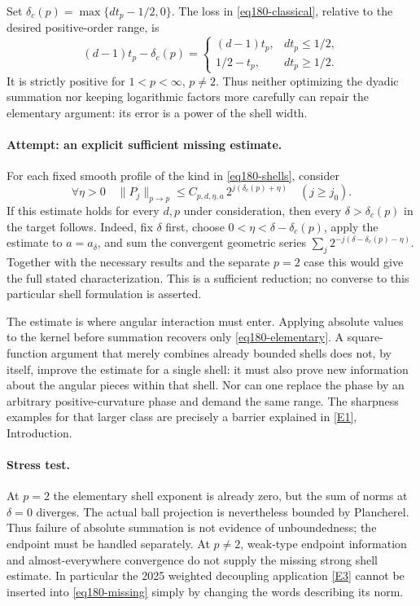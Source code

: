 \documentclass[11pt,a4paper]{article}
\newcommand{\eref}[2]{\hyperlink{extra:#1:#2}{[E#2]}}
\numberwithin{equation}{section}
\begin{document}
Set $\delta_c(p)=\max\{dt_p-1/2,0\}$. The loss in
\eqref{eq180-classical}, relative to the desired positive-order range, is
\begin{equation}\label{eq180-loss}
 (d-1)t_p-\delta_c(p)=
 \begin{cases}(d-1)t_p,&dt_p\le1/2,\\
               1/2-t_p,&dt_p\ge1/2.
 \end{cases}
\end{equation}
It is strictly positive for $1<p<\infty$, $p\ne2$. Thus neither optimizing
the dyadic summation nor keeping logarithmic factors more carefully can
repair the elementary argument: its error is a power of the shell width.

\paragraph{Attempt: an explicit sufficient missing estimate.}
For each fixed smooth profile of the kind in \eqref{eq180-shells}, consider
\begin{equation}\label{eq180-missing}
 \forall\eta>0\quad
 \|P_j\|_{p\to p}\le C_{p,d,\eta,a}\,
                         2^{j(\delta_c(p)+\eta)}
                  \quad(j\ge j_0).
\end{equation}
If this estimate holds for every $d,p$ under consideration, then every
$\delta>\delta_c(p)$ in the target follows. Indeed, fix $\delta$ first,
choose $0<\eta<\delta-\delta_c(p)$, apply the estimate to
$a=a_\delta$, and sum the convergent geometric series
$\sum_j2^{-j(\delta-\delta_c(p)-\eta)}$.
Together with the necessary results and the separate $p=2$ case this
would give the full stated characterization. This is a sufficient
reduction; no converse to this particular shell formulation is asserted.

The estimate is where angular interaction must enter. Applying absolute
values to the kernel before summation recovers only
\eqref{eq180-elementary}. A square-function argument that merely combines
already bounded shells does not, by itself, improve the estimate for a
single shell: it must also prove new information about the angular pieces
within that shell. Nor can one replace the phase by an arbitrary
positive-curvature phase and demand the same range. The sharpness examples
for that larger class are precisely a barrier explained in
\eref{30006774}{1}, Introduction.

\paragraph{Stress test.}
At $p=2$ the elementary shell exponent is already zero, but the sum of
norms at $\delta=0$ diverges. The actual ball projection is nevertheless
bounded by Plancherel. Thus failure of absolute summation is not evidence
of unboundedness; the endpoint must be handled separately. At $p\ne2$,
weak-type endpoint information and almost-everywhere convergence do not
supply the missing strong shell estimate. In particular the 2025 weighted
decoupling application \eref{30006774}{3} cannot be inserted into
\eqref{eq180-missing} simply by changing the words describing its norm.
\end{document}
